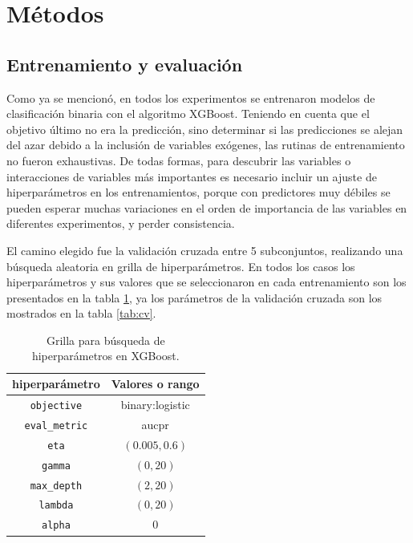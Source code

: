 \documentclass[a4paper,11pt,dvipsnames]{article}
\begin{document}
\section{Métodos}

\subsection{Entrenamiento y evaluación}

Como ya se mencionó, en todos los experimentos se entrenaron modelos de clasificación binaria con el algoritmo XGBoost. Teniendo en cuenta que el objetivo último no era la predicción, sino determinar si las predicciones se alejan del azar debido a la inclusión de variables exógenes, las rutinas de entrenamiento no fueron exhaustivas. De todas formas, para descubrir las variables o interacciones de variables más importantes es necesario incluir un ajuste de hiperparámetros en los entrenamientos, porque con predictores muy débiles se pueden esperar muchas variaciones en el orden de importancia de las variables en diferentes experimentos, y perder consistencia.\par\medskip 

El camino elegido fue la validación cruzada entre 5 subconjuntos, realizando una búsqueda aleatoria en grilla de hiperparámetros. En todos los casos los hiperparámetros y sus valores que se seleccionaron en cada entrenamiento son los presentados en la tabla \ref{tab:hiperparámetros}, ya los parámetros de la validación cruzada son los mostrados en la tabla \ref{tab:cv}.

\begin{table}[!ht]
    \caption{Grilla para búsqueda de hiperparámetros en XGBoost.}
    \begin{center}
    \begin{tabular}{cc}
    \hline
    \textbf{hiperparámetro} & \textbf{Valores o rango}\\
    \hline
    \texttt{objective}  & binary:logistic\\
    \texttt{eval\_metric} & aucpr\\
    \texttt{eta} & $(0.005,0.6)$\\
    \texttt{gamma} & $(0,20)$\\
    \texttt{max\_depth} & $(2,20)$\\
    \texttt{lambda} & $(0,20)$\\
    \texttt{alpha} & 0\\
    \hline
    \end{tabular}
    \label{tab:hiperparámetros}
    \end{center}
\end{table}
\end{document}
